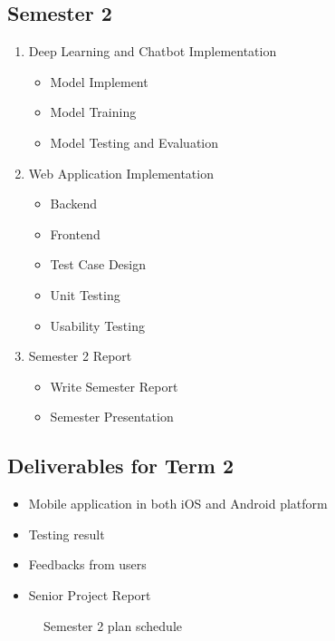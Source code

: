 \documentclass[12pt,oneside,openright,a4paper]{cpe-english-project}
\begin{document}
    \subsection{Semester 2}
      \begin{enumerate}
        \item Deep Learning and Chatbot Implementation
          \begin{itemize}
            \item Model Implement
            \item Model Training
            \item Model Testing and Evaluation
          \end{itemize}
        \item Web Application Implementation
          \begin{itemize}
            \item Backend
            \item Frontend
            \item Test Case Design
            \item Unit Testing
            \item Usability Testing
          \end{itemize}
        \item Semester 2 Report
          \begin{itemize}
            \item Write Semester Report
            \item Semester Presentation
          \end{itemize}
      \end{enumerate}

    \subsection*{Deliverables for Term 2}
      \begin{itemize}
        \item Mobile application in both iOS and Android platform
        \item Testing result
        \item Feedbacks from users
        \item Senior Project Report
      \end{itemize}
      \begin{figure}[!h]
        \centering
        \caption{Semester 2 plan schedule}\label{fig:Term2_Gantt}
      \end{figure}
\end{document}
